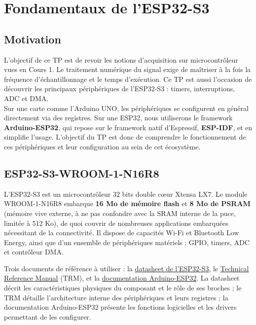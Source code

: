\chapter{Fondamentaux de l'ESP32-S3}

\section*{Motivation}

L'objectif de ce TP est de revoir les notions d'acquisition sur microcontrôleur vues en Cours 1. Le traitement numérique du signal exige de maîtriser à la fois la fréquence d'échantillonnage et le temps d'exécution. Ce TP est aussi l'occasion de découvrir les principaux périphériques de l'ESP32-S3 : timers, interruptions, ADC et DMA.\\

Sur une carte comme l'Arduino UNO, les périphériques se configurent en général directement via des registres. Sur une ESP32, nous utiliserons le framework \textbf{Arduino-ESP32}, qui repose sur le framework natif d'Espressif, \textbf{ESP-IDF}, et en simplifie l'usage. L'objectif du TP est donc de comprendre le fonctionnement de ces périphériques et leur configuration au sein de cet écosystème.

\section{ESP32-S3-WROOM-1-N16R8}

L'ESP32-S3 est un microcontrôleur 32 bits double c\oe ur Xtensa LX7. Le module WROOM-1-N16R8 embarque \textbf{16 Mo de mémoire flash} et \textbf{8 Mo de PSRAM} (mémoire vive externe, à ne pas confondre avec la SRAM interne de la puce, limitée à 512 Ko), de quoi couvrir de nombreuses applications embarquées nécessitant de la connectivité. Il dispose de capacités Wi-Fi et Bluetooth Low Energy, ainsi que d'un ensemble de périphériques matériels : GPIO, timers, ADC et contrôleur DMA.\\

\begin{imp}
Trois documents de référence à utiliser : la \href{https://www.mouser.fr/datasheet/3/1574/1/esp32-s3-wroom-1_wroom-1u_datasheet_en.pdf}{datasheet de l'ESP32-S3}, le \href{https://documentation.espressif.com/esp32-s3_technical_reference_manual_en.pdf}{Technical Reference Manual} (TRM), et la \href{https://docs.espressif.com/projects/arduino-esp32/en/latest/getting_started.html}{documentation Arduino-ESP32}.
La datasheet décrit les caractéristiques physiques du composant et le rôle de ses broches ; le TRM détaille l'architecture interne des périphériques et leurs registres ; la documentation Arduino-ESP32 présente les fonctions logicielles et les drivers permettant de les configurer.
\end{imp}

